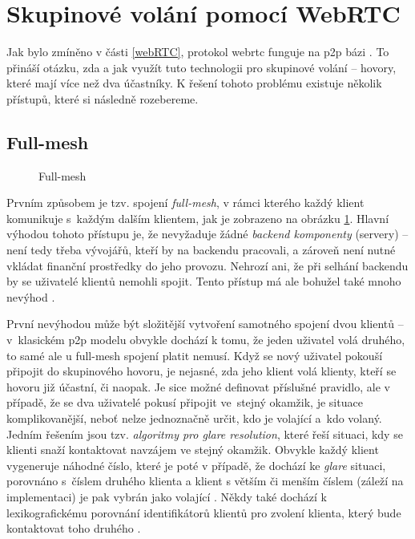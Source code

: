 \section{Skupinové volání pomocí WebRTC}\label{connectionModels}

Jak bylo zmíněno v části \ref{webRTC}, protokol \gls{webrtc} funguje na
\gls{p2p} bázi \parencite{WebRTCORG-PeerConnections}. To přináší otázku, zda a
jak využít tuto technologii pro skupinové volání -- hovory, které mají více než
dva účastníky. K řešení tohoto problému existuje několik přístupů, které si
následně rozebereme.

\subsection{Full-mesh}

\begin{figure}[H]
    \centering
    \caption{Full-mesh}
    \label{fullMeshFig}
\end{figure}

Prvním způsobem je tzv. spojení \textit{full-mesh}, v rámci kterého každý klient
komunikuje s~každým dalším klientem, jak je zobrazeno na obrázku
\ref{fullMeshFig}. Hlavní výhodou tohoto přístupu je, že nevyžaduje žádné
\textit{backend komponenty} (servery) -- není tedy třeba vývojářů, kteří by na
backendu pracovali, a zároveň není nutné vkládat finanční prostředky do jeho
provozu. Nehrozí ani, že při selhání backendu by se uživatelé klientů nemohli
spojit. Tento přístup má ale bohužel také mnoho nevýhod
\parencite{HalOpenScience-SFUs}.

První nevýhodou může být složitější vytvoření samotného spojení dvou klientů --
v~klasickém \gls{p2p} modelu obvykle dochází k tomu, že jeden uživatel volá
druhého, to samé ale u full-mesh spojení platit nemusí. Když se nový uživatel
pokouší připojit do skupinového hovoru, je nejasné, zda jeho klient volá
klienty, kteří se hovoru již účastní, či naopak. Je sice možné definovat
příslušné pravidlo, ale v případě, že se dva uživatelé pokusí připojit ve~stejný
okamžik, je situace komplikovanější, neboť nelze jednoznačně určit, kdo je
volající a~kdo volaný. Jedním řešením jsou tzv. \textit{algoritmy pro glare
    resolution}, které řeší situaci, kdy se klienti snaží kontaktovat navzájem ve
stejný okamžik. Obvykle každý klient vygeneruje náhodné číslo, které je poté v
případě, že dochází ke \textit{glare} situaci, porovnáno s~číslem druhého
klienta a klient s větším či menším číslem (záleží na implementaci) je pak
vybrán jako volající \parencite{MagnusWesterlund-GlareInWebRTC}. Někdy také
dochází k lexikografickému porovnání identifikátorů klientů pro zvolení klienta,
který bude kontaktovat toho druhého \parencite{GitHub-MSC3401}.

